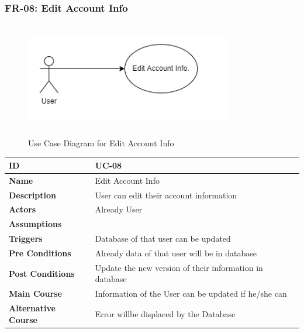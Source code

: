     \subsubsection{FR-08: Edit Account Info}
    \begin{figure}[H]
        \includegraphics[height=5cm, width=0.8\textwidth]{./diagrams/Use Case/u8.png}
        \centering 
        \caption{Use Case Diagram for Edit Account Info}
        \label{fig:Usecase1}
        \end{figure}
        
    \begin{center}
        \begin{tabularx}{\textwidth}{|l|X|}
            \hline
            \textbf{ID} & UC-08 \\
            \hline
            \textbf{Name} & Edit Account Info \\
            \hline
            \textbf{Description} & User can edit their account information \\
            \hline
            \textbf{Actors} & Already User \\
            \hline
            \textbf{Assumptions} &  \\
            \hline
            \textbf{Triggers} & Database of that user can be updated \\
            \hline
            \textbf{Pre Conditions} & Already data of that user will be in database  \\
            \hline
            \textbf{Post Conditions} & Update the new version of their information in database \\
            \hline
            \textbf{Main Course} & Information of the User can be updated if he/she can \\
            \hline
            \textbf{Alternative Course} & Error willbe displaced by the Database \\
            \hline
            
        \end{tabularx}
    \end{center}
    \newpage 
    

